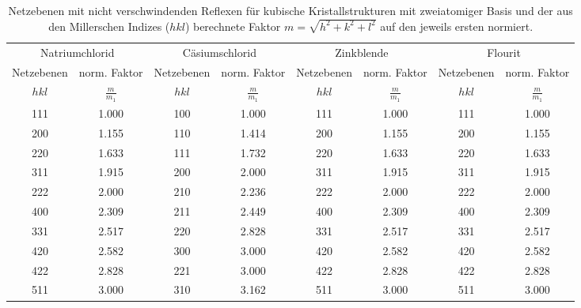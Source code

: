\begin{table}[!h]
	\centering
	\begin{adjustbox}{width=\textwidth}
		\begin{tabular}{cccccccc}
			\toprule
			\multicolumn{2}{c}{Natriumchlorid}&\multicolumn{2}{c}{Cäsiumschlorid} & \multicolumn{2}{c}{Zinkblende}& \multicolumn{2}{c}{Flourit}\\\cmidrule(rl){1-2}\cmidrule(rl){3-4}\cmidrule(rl){5-6}\cmidrule(rl){7-8}
		Netzebenen & norm. Faktor & Netzebenen & norm. Faktor & Netzebenen & norm. Faktor & Netzebenen & norm. Faktor\\
		$hkl$ & $\frac{m}{m_1}$ & $hkl$ & $\frac{m}{m_1}$ & $hkl$ & $\frac{m}{m_1}$ & $hkl$ & $\frac{m}{m_1}$\\
\midrule
		\num{111} & \num{1.000} & \num{100} & \num{1.000} & \num{111} & \num{1.000} & \num{111} & \num{1.000}\\
		\num{200} & \num{1.155} & \num{110} & \num{1.414} & \num{200} & \num{1.155} & \num{200} & \num{1.155}\\
		\num{220} & \num{1.633} & \num{111} & \num{1.732} & \num{220} & \num{1.633} & \num{220} & \num{1.633}\\
		\num{311} & \num{1.915} & \num{200} & \num{2.000} & \num{311} & \num{1.915} & \num{311} & \num{1.915}\\
		\num{222} & \num{2.000} & \num{210} & \num{2.236} & \num{222} & \num{2.000} & \num{222} & \num{2.000}\\
		\num{400} & \num{2.309} & \num{211} & \num{2.449} & \num{400} & \num{2.309} & \num{400} & \num{2.309}\\
		\num{331} & \num{2.517} & \num{220} & \num{2.828} & \num{331} & \num{2.517} & \num{331} & \num{2.517}\\
		\num{420} & \num{2.582} & \num{300} & \num{3.000} & \num{420} & \num{2.582} & \num{420} & \num{2.582}\\
		\num{422} & \num{2.828} & \num{221} & \num{3.000} & \num{422} & \num{2.828} & \num{422} & \num{2.828}\\
		\num{511} & \num{3.000} & \num{310} & \num{3.162} & \num{511} & \num{3.000} & \num{511} & \num{3.000}\\
		\bottomrule
	\end{tabular}
	\end{adjustbox}
	\caption{Netzebenen mit nicht verschwindenden Reflexen für kubische Kristallstrukturen mit zweiatomiger Basis und der aus 
den Millerschen Indizes ($hkl$) berechnete Faktor $m = \sqrt{h^2+k^2+l^2}$ auf den jeweils ersten normiert. \label{tab:reflexe_2_atom}}
\end{table}

